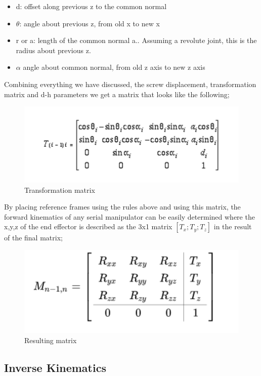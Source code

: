     \begin{itemize}
        \item d: offset along previous  z to the common normal
        \item $\theta$: angle about previous z, from old x to new x
        \item r or a: length of the common normal a.. Assuming a revolute joint, this is the radius about previous z.
        \item $\alpha$ angle about common normal, from old z axis to new z axis
    \end{itemize}
    Combining everything we have discussed, the screw displacement, transformation matrix and d-h parameters we get a matrix that looks like the following;
     \begin{figure}[H]
        \centering
        \includegraphics[width=150mm]{Matrizx.PNG}
        \caption{Transformation matrix}
        \label{fig:my_label}
    \end{figure}
    By placing reference frames using the rules above and using this matrix, the forward kinematics of any serial manipulator can be easily determined where the x,y,z of the end effector is described as the 3x1 matrix $[T_x; T_y; T_z]$ in the result of the final matrix; 
     \begin{figure}[H]
        \centering
        \includegraphics[width=150mm]{Matrix2.PNG}
        \caption{Resulting matrix}
        \label{fig:my_label}
    \end{figure}
\subsection{Inverse Kinematics}
